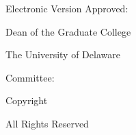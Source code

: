 {\begin{titlepage}
		\begingroup
		\renewcommand{\thesis@memberline}[2]{##1\par}%
		\noindent
		\begin{minipage}[t]{0.48\textwidth}
			\raggedright
			Electronic Version Approved:\par
			\vspace{\baselineskip}
			\thesis@ud@dean\par
			Dean of the Graduate College\par
			The University of Delaware\par
			\thesis@ud@approvaldate\par
		\end{minipage}%
		\hfill
		\begin{minipage}[t]{0.48\textwidth}
			\raggedright
			Committee:\par
			\vspace{\baselineskip}
			\thesis@committee
		\end{minipage}%
		\endgroup
		\vfill
		\begin{center}
			Copyright \thesis@ud@copyrightyear{} \@author\par
			All Rights Reserved\par
		\end{center}
	\end{titlepage}%
}

%
%
\thesisnoapprovalpage
